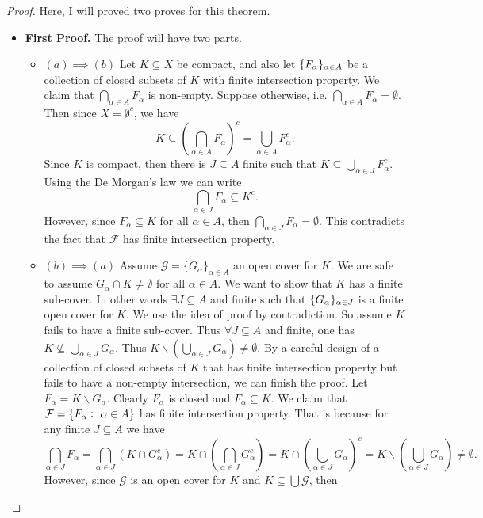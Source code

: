 \begin{proof}
	Here, I will proved two proves for this theorem.
	
	\begin{itemize}
		\item \textbf{First Proof.} The proof will have two parts.
		\begin{itemize}
			\item [\LEFTcircle] $(a) \implies (b)$ Let $K\subseteq X$ be compact, and also let $\{F_{\alpha}\}_{\alpha\in A}$ be a collection of closed subsets of $K$ with finite intersection property. We claim that $\bigcap_{\alpha\in A} F_\alpha$ is non-empty. Suppose otherwise, i.e. $\bigcap_{\alpha\in A} F_\alpha = \emptyset$. Then since $X = \emptyset^c$, we have
			\[ K \subseteq (\bigcap_{\alpha\in A} F_\alpha)^c = \bigcup_{\alpha \in A} F_\alpha^c. \]
			Since $K$ is compact, then there is $J \subseteq A$ finite such that $K \subseteq \bigcup_{\alpha\in J} F_\alpha^c$. Using the De Morgan's law we can write
			\[ \bigcap_{\alpha\in J} F_\alpha \subseteq K^c. \]
			However, since $F_\alpha \subseteq K$ for  all $\alpha \in A$, then $\bigcap_{\alpha\in J} F_\alpha = \emptyset$. This contradicts the fact that $\mathcal{F}$ has finite intersection property.
			\item [\RIGHTcircle] $(b) \implies (a)$ Assume $\mathcal{G} = \{G_\alpha\}_{\alpha\in A}$ an open cover for $K$. We are safe to assume $G_\alpha \cap K \neq \emptyset$ for all $\alpha \in A$. We want to show that $K$ has a finite sub-cover. In other words $\exists J \subseteq A$ and finite such that $\{G_{\alpha}\}_{\alpha\in J}$ is a finite open cover for $K$. We use the idea of proof by contradiction. So assume $K$ fails to have a finite sub-cover. Thus $\forall J \subseteq A$ and finite, one has $K \not\subseteq \bigcup_{\alpha\in J} G_\alpha$. Thus $K \backslash (\bigcup_{\alpha\in J} G_\alpha) \not= \emptyset.$ By a careful design of a collection of closed subsets of $K$ that has finite intersection property but fails to have a non-empty intersection, we can finish the proof. Let $F_\alpha = K \backslash G_\alpha$. Clearly $F_\alpha$ is closed and $F_\alpha \subseteq K$. We claim that $\mathcal{F} = \set{F_\alpha:\ \alpha \in A}$ has finite intersection property. That is because for any finite $J \subseteq A$ we have
			\[ \bigcap_{\alpha\in J} F_\alpha = \bigcap_{\alpha\in J}(K \cap G_\alpha^c) = K \cap (\bigcap_{\alpha\in J} G_\alpha^c) =  K \cap (\bigcup_{\alpha\in J} G_\alpha)^c = K \backslash (\bigcup_{\alpha\in J} G_\alpha) \neq \emptyset. \]
			However, since $\mathcal{G}$ is an open cover for $K$ and $K \subseteq \bigcup \mathcal{G}$, then 

\end{itemize}
\end{itemize}
\end{proof}
